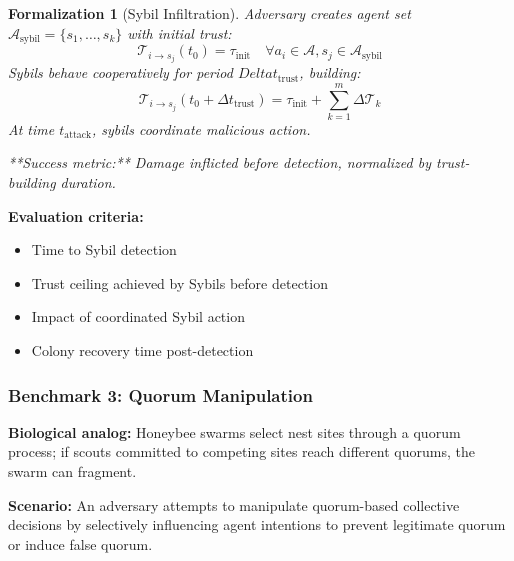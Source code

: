 \documentclass[
]{article}
\providecommand{\tightlist}{%
  \setlength{\itemsep}{0pt}\setlength{\parskip}{0pt}}
\newtheorem{formalization}[theorem]{Formalization}
\begin{document}
\begin{formalization}[Sybil Infiltration]
\label{form:sybil-infiltration}
Adversary creates agent set $\mathcal{A}_{\text{sybil}} = \{s_1, \ldots, s_k\}$ with initial trust:
\begin{equation}
\mathcal{T}_{i \to s_j}(t_0) = \tau_{\text{init}} \quad \forall a_i \in \mathcal{A}, s_j \in \mathcal{A}_{\text{sybil}}
\label{eq:sybil-initial-trust}
\end{equation}
Sybils behave cooperatively for period $Delta t_{\text{trust}}$, building:
\begin{equation}
\mathcal{T}_{i \to s_j}(t_0 + \Delta t_{\text{trust}}) = \tau_{\text{init}} + \sum_{k=1}^{m} \Delta\mathcal{T}_k
\label{eq:sybil-trust-accumulation}
\end{equation}
At time $t_{\text{attack}}$, sybils coordinate malicious action.

**Success metric:** Damage inflicted before detection, normalized by trust-building duration.
\end{formalization}

\textbf{Evaluation criteria:}

\begin{itemize}
\tightlist
\item
  Time to Sybil detection
\item
  Trust ceiling achieved by Sybils before detection
\item
  Impact of coordinated Sybil action
\item
  Colony recovery time post-detection
\end{itemize}

\subsubsection{Benchmark 3: Quorum
Manipulation}\label{sec:benchmark-quorum}

\textbf{Biological analog:} Honeybee swarms select nest sites through a
quorum process; if scouts committed to competing sites reach different
quorums, the swarm can fragment.

\textbf{Scenario:} An adversary attempts to manipulate quorum-based
collective decisions by selectively influencing agent intentions to
prevent legitimate quorum or induce false quorum.
\end{document}

